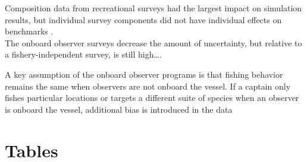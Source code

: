 \documentclass[
  authoryear,
  preprint,
  3p]{elsarticle}
\begin{document}
Composition data from recreational surveys had the largest impact on
simulation results, but individual survey components did not have
individual effects on benchmarks \citep{Siegfried:2016:ISA}.\\

The onboard observer surveys decrease the amount of uncertainty, but
relative to a fishery-independent survey, is still high\ldots.

A key assumption of the onboard observer programs is that fishing
behavior remains the same when observers are not onboard the vessel. If
a captain only fishes particular locations or targets a different suite
of species when an observer is onboard the vessel, additional bias is
introduced in the data

\FloatBarrier

\hypertarget{tables}{%
\section{Tables}\label{tables}}
\end{document}
